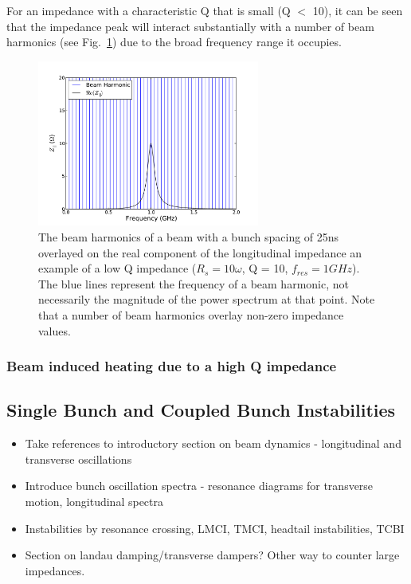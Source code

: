 For an impedance with a characteristic Q that is small (Q $<$ 10), it can be seen that the impedance peak will interact substantially with a number of beam harmonics (see Fig.~\ref{fig:low_q_harmonics}) due to the broad frequency range it occupies.

\begin{figure}
\begin{center}
\includegraphics[width=0.65\textwidth]{figures/wakefields_and_impedance/low_q_10_resonance_beam_harmonics.pdf}
\end{center}
\label{fig:low_q_harmonics}
\caption{The beam harmonics of a beam with a bunch spacing of 25ns overlayed on the real component of the longitudinal impedance an example of a low Q impedance ($R_{s}=10\omega$, Q = 10, $f_{res}=1GHz$). The blue lines represent the frequency of a beam harmonic, not necessarily the magnitude of the power spectrum at that point. Note that a number of beam harmonics overlay non-zero impedance values.}
\end{figure}

\subsubsection{Beam induced heating due to a high Q impedance}




\subsection{Single Bunch and Coupled Bunch Instabilities}

\begin{itemize}
\item{Take references to introductory section on beam dynamics - longitudinal and transverse oscillations}
\item{Introduce bunch oscillation spectra - resonance diagrams for transverse motion, longitudinal spectra}
\item{Instabilities by resonance crossing, LMCI, TMCI, headtail instabilities, TCBI}
\item{Section on landau damping/transverse dampers? Other way to counter large impedances.}
\end{itemize}

